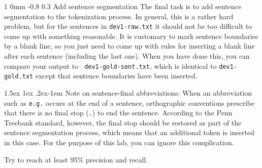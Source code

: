 \documentclass[11pt]{article}
\makeatletter
\newcommand{\newsec}[2]{\section{#1}\label{sec:#2}\noindent}
\renewcommand{\section}{\@startsection
{section}%
{1}%
{0mm}%
{-0.8\baselineskip}%
{0.3\baselineskip}%
{\bfseries\large}}%
\renewcommand{\paragraph}{%
  \@startsection{paragraph}{4}%
  {\z@}{1.5ex \@plus 1ex \@minus .2ex}{-1em}%
  {\normalfont\normalsize\bfseries}%
}\makeatother
\makeatother
\begin{document}
\newsec{Add sentence segmentation }{sent}%
The final task is to add sentence segmentation to the tokenization
process. In general, this is a rather hard problem, but for the
sentences in {\tt dev1-raw.txt} it should not be too difficult to come
up with something reasonable. It is customary to mark sentence
boundaries by a blank line, so you just need to come up with rules for
inserting a blank line after each sentence (including the last
one). When you have done this, you can compare your output to {\tt
  dev1-gold-sent.txt}, which is identical to {\tt dev1-gold.txt}
except that sentence boundaries have been inserted.

\paragraph{Note on sentence-final abbreviations:} When an abbreviation
such as {\tt e.g.} occurs at the end of a sentence, orthographic
conventions prescribe that there is no final stop ({\tt .}) to end the
sentence. According to the Penn Treebank standard, however, the final
stop should be restored as part of the sentence segmentation process,
which means that an additional token is inserted in this case. For the
purpose of this lab, you can ignore this complication.

\indent Try to reach at least 95\% precision and recall.

\end{document}
